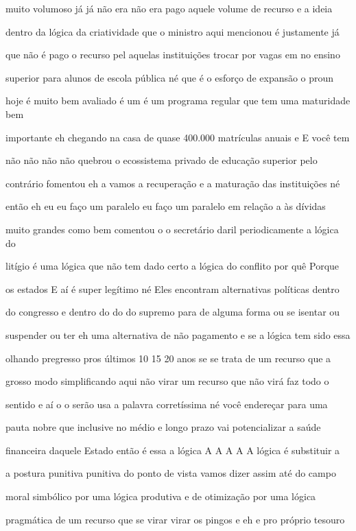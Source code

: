 \documentclass[a4paper,12pt]{article}
\begin{document}
muito volumoso já já não era não era pago aquele volume de recurso e a ideia

dentro da lógica da criatividade que o ministro aqui mencionou é justamente já

que não é pago o recurso pel aquelas instituições trocar por vagas em no ensino

superior para alunos de escola pública né que é o esforço de expansão o proun

hoje é muito bem avaliado é um é um programa regular que tem uma maturidade bem

importante eh chegando na casa de quase 400.000 matrículas anuais e E você tem

não não não não quebrou o ecossistema privado de educação superior pelo

contrário fomentou eh a vamos a recuperação e a maturação das instituições né

então eh eu eu faço um paralelo eu faço um paralelo em relação a às dívidas

muito grandes como bem comentou o o secretário daril periodicamente a lógica do

litígio é uma lógica que não tem dado certo a lógica do conflito por quê Porque

os estados E aí é super legítimo né Eles encontram alternativas políticas dentro

do congresso e dentro do do do supremo para de alguma forma ou se isentar ou

suspender ou ter eh uma alternativa de não pagamento e se a lógica tem sido essa

olhando pregresso pros últimos 10 15 20 anos se se trata de um recurso que a

grosso modo simplificando aqui não virar um recurso que não virá faz todo o

sentido e aí o o serão usa a palavra corretíssima né você endereçar para uma

pauta nobre que inclusive no médio e longo prazo vai potencializar a saúde

financeira daquele Estado então é essa a lógica A A A A A lógica é substituir a

a postura punitiva punitiva do ponto de vista vamos dizer assim até do campo

moral simbólico por uma lógica produtiva e de otimização por uma lógica

pragmática de um recurso que se virar virar os pingos e eh e pro próprio tesouro
\end{document}

